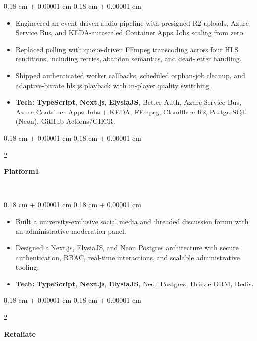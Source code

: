\documentclass[10pt, letterpaper]{article}
\newenvironment{highlights}{
    \begin{itemize}[
        topsep=0.09 cm,
        parsep=0.09 cm,
        partopsep=0pt,
        itemsep=0pt,
        leftmargin=0.4 cm + 10pt
    ]
}{
    \end{itemize}
} %
\newenvironment{onecolentry}{
    \begin{adjustwidth}{
        0.18 cm + 0.00001 cm
    }{
        0.18 cm + 0.00001 cm
    }
}{
    \end{adjustwidth}
} %
\newenvironment{twocolentry}[2][]{
    \onecolentry
    \def\secondColumn{#2}
    \setcolumnwidth{\fill, 4.5 cm}
    \begin{paracol}{2}
}{
    \switchcolumn \raggedleft \secondColumn
    \end{paracol}
    \endonecolentry
} %
\let\hrefWithoutArrow\href
\renewcommand{\href}[2]{\hrefWithoutArrow{#1}{\ifthenelse{\equal{#2}{}}{ }{#2 }\raisebox{.15ex}{\footnotesize \faExternalLink*}}}
\begin{document}
\vspace{0.02 cm}
\begin{onecolentry}
    \begin{highlights}
        \item Engineered an event-driven audio pipeline with presigned R2 uploads, Azure Service Bus, and KEDA-autoscaled Container Apps Jobs scaling from zero.
        \item Replaced polling with queue-driven FFmpeg transcoding across four HLS renditions, including retries, abandon semantics, and dead-letter handling.
        \item Shipped authenticated worker callbacks, scheduled orphan-job cleanup, and adaptive-bitrate hls.js playback with in-player quality switching.
        \item \textbf{Tech:} \textbf{TypeScript}, \textbf{Next.js}, \textbf{ElysiaJS}, Better Auth, Azure Service Bus, Azure Container Apps Jobs + KEDA, FFmpeg, Cloudflare R2, PostgreSQL (Neon), GitHub Actions/GHCR.
    \end{highlights}
\end{onecolentry}

\vspace{0.05 cm}

\begin{twocolentry}{
\href{https://platform1.niravv.me}{\faGlobe} \ \href{https://github.com/ni3rav/platform1}{\faGithub}
}
    \textbf{Platform1}
\end{twocolentry}

\vspace{0.02 cm}
\begin{onecolentry}
    \begin{highlights}
        \item Built a university-exclusive social media and threaded discussion forum with an administrative moderation panel.
        \item Designed a Next.js, ElysiaJS, and Neon Postgres architecture with secure authentication, RBAC, real-time interactions, and scalable administrative tooling.
        \item \textbf{Tech:} \textbf{TypeScript}, \textbf{Next.js}, \textbf{ElysiaJS}, Neon Postgres, Drizzle ORM, Redis.
    \end{highlights}
\end{onecolentry}
\vspace{0.05 cm}


\begin{twocolentry}{
\href{https://stackblitz.com/edit/retaliate-live}{\faGlobe} \ \href{https://github.com/ni3rav/retaliate}{\faGithub}
}
    \textbf{Retaliate}
\end{twocolentry}
\end{document}
